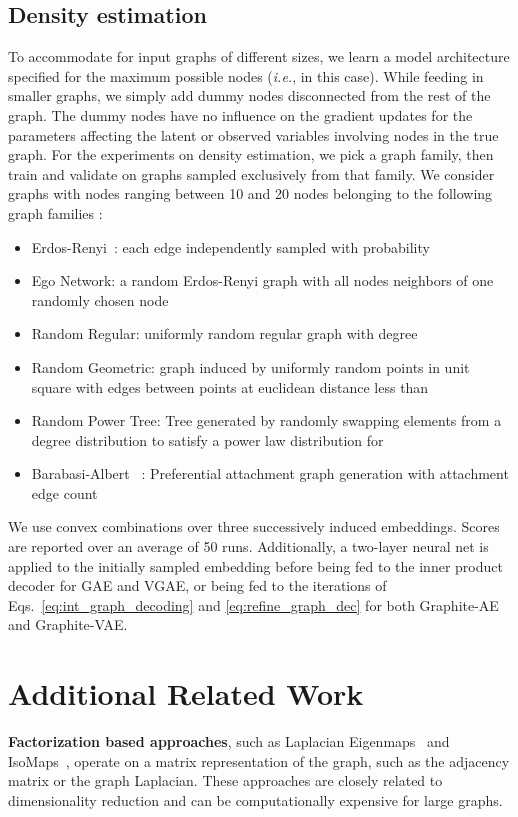 \documentclass{article}
\begin{document}
\subsection{Density estimation}
To accommodate for input graphs of different sizes, we learn a model architecture specified for the maximum possible nodes (\textit{i.e.},  in this case). While feeding in smaller graphs, we simply add dummy nodes disconnected from the rest of the graph. The dummy nodes have no influence on the gradient updates for the parameters affecting the latent or observed variables involving nodes in the true graph.
For the experiments on density estimation, we pick a graph family, then train and validate on graphs sampled exclusively from that family.  We consider graphs with nodes ranging between 10 and 20 nodes belonging to the following graph families :
\begin{itemize}
\item Erdos-Renyi~\citep{erdos1959random}: each edge independently sampled with probability 
\item Ego Network: a random Erdos-Renyi graph with all nodes neighbors of one randomly chosen node
\item Random Regular: uniformly random regular graph with degree 
\item Random Geometric: graph induced by uniformly random points in unit square with edges between points at euclidean distance less than 
\item Random Power Tree: Tree generated by randomly swapping elements from a degree distribution to satisfy a power law distribution for 
\item Barabasi-Albert ~\citep{barabasi1999random}: Preferential attachment graph generation with attachment edge count 
\end{itemize}

We use convex combinations over three successively induced embeddings.  Scores are reported over an average of 50 runs.  Additionally, a two-layer neural net is applied to the initially sampled embedding  before being fed to the inner product decoder for GAE and VGAE, or being fed to the iterations of Eqs.~\eqref{eq:int_graph_decoding} and \eqref{eq:refine_graph_dec} for both Graphite-AE and Graphite-VAE.


  \section{Additional Related Work}\label{app:related}
  \textbf{Factorization based approaches}, such as Laplacian Eigenmaps~\citep{belkin2002laplacian} and IsoMaps~\citep{saxena2004non}, operate on a matrix representation of the graph, such as the adjacency matrix or the graph Laplacian. These approaches are closely related to dimensionality reduction and can be computationally expensive for large graphs. 
\end{document}
